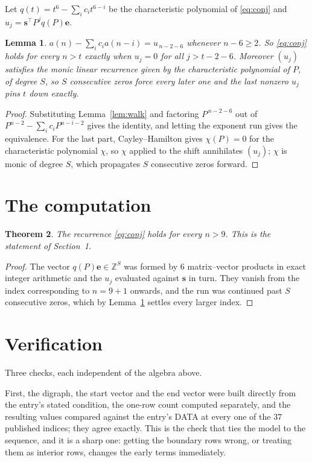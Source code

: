 \documentclass[11pt,a4paper]{article}
\theoremstyle{plain}
\newtheorem{theorem}{Theorem}
\newtheorem{lemma}[theorem]{Lemma}
\theoremstyle{definition}
\begin{document}
Let $q(t)=t^{6}-\sum_i c_i t^{6-i}$ be the characteristic polynomial of
\eqref{eq:conj} and $u_j=\mathbf{s}^{\!\top}P^{j}q(P)\mathbf{e}$.

\begin{lemma}\label{lem:crit}
$a(n)-\sum_i c_i a(n-i)=u_{\,n-2-6}$ whenever $n-6\ge2$. So \eqref{eq:conj}
holds for every $n>t$ exactly when $u_j=0$ for all $j>t-2-6$. Moreover $(u_j)$
satisfies the monic linear recurrence given by the characteristic polynomial of $P$, of
degree $S$, so $S$ consecutive zeros force every later one and the last nonzero $u_j$ pins
$t$ down exactly.
\end{lemma}

\begin{proof}
Substituting Lemma~\ref{lem:walk} and factoring $P^{\,n-2-6}$ out of
$P^{n-2}-\sum_i c_i P^{n-i-2}$ gives the identity, and letting the exponent run gives the
equivalence. For the last part, Cayley--Hamilton gives $\chi(P)=0$ for the characteristic
polynomial $\chi$, so $\chi$ applied to the shift annihilates $(u_j)$; $\chi$ is monic of
degree $S$, which propagates $S$ consecutive zeros forward.
\end{proof}

\section{The computation}

\begin{theorem}
The recurrence \eqref{eq:conj} holds for every $n>9$. This is the statement of
Section~1.
\end{theorem}

\begin{proof}
The vector $q(P)\mathbf{e}\in\mathbb{Z}^{S}$ was formed by $6$ matrix--vector
products in exact integer arithmetic and the $u_j$ evaluated against $\mathbf{s}$ in turn.
They vanish from the index corresponding to $n=9+1$ onwards, and the run was continued
past $S$ consecutive zeros, which by Lemma~\ref{lem:crit} settles every larger index.
\end{proof}

\section{Verification}

Three checks, each independent of the algebra above.

First, the digraph, the start vector and the end vector were built directly from the
entry's stated condition, the one-row count computed separately, and the resulting values
compared against the entry's DATA at every one of the $37$ published indices; they
agree exactly. This is the check that ties the model to the sequence, and it is a sharp one:
getting the boundary rows wrong, or treating them as interior rows, changes the early terms
immediately.
\end{document}
